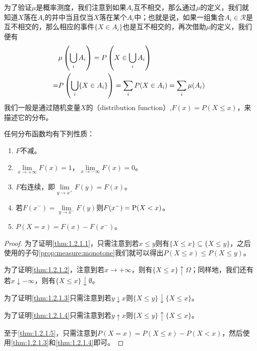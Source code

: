 \documentclass[main.tex]{subfiles}
\begin{document}
为了验证\(\mu\)是概率测度，我们注意到如果\(A_i\)互不相交，那么通过\(\mu\)的定义，我们就知道\(X\)落在\(A_i\)的并中当且仅当\(X\)落在某个\(A_i\)中；也就是说，如果一组集合\(A_i \in \mathcal{R}\)是互不相交的，那么相应的事件\(\{X \in A_i\}\)也是互不相交的，再次借助\(\mu\)的定义，我们便有
\[\begin{split}
	&\mu\del{\bigcup_{i}A_i} = P\del{X \in \bigcup_{i}A_i}\\ =&P\del{\bigcup_{i} \{X \in A_i\}} = \sum_{i} P(X \in A_i) = \sum_i \mu(A_i)
\end{split}\]
我们一般是通过随机变量\(X\)的（distribution function）,\(F(x) = P(X \leq x)\)，来描述它的分布。

\begin{theorem} \label{thm:1.2.1}
	任何分布函数均有下列性质：
	\begin{enumerate}
		\item \label{thm:1.2.1.1} \(F\)不减。
		\item\label{thm:1.2.1.2} \(\lim\limits_{x \rightarrow +\infty} F(x) = 1\)，\(\lim\limits_{x \rightarrow -\infty} F(x) = 0\)。
		\item\label{thm:1.2.1.3} \(F\)右连续，即\(\lim\limits_{y \rightarrow x^+} F(y) = F(x)\)。
		\item\label{thm:1.2.1.4} 若\(F(x^-) = \lim\limits_{y\rightarrow x^-}F(y)\)则\(F(x^-) = \operatorname{\mathrm{P}}(X < x)\)。
		\item\label{thm:1.2.1.5} \(P(X=x) = F(x) - F(x^-)\)。
	\end{enumerate}
\end{theorem}
\begin{proof}
	为了证明\ref{thm:1.2.1.1}，只需注意到若\(x \leq y\)则有\(\{X \leq x\} \subseteq \{X \leq y\}\)，之后使用的子句\ref{prop:measure:monotone}我们就可以得出\(P(X \leq x) \leq P(X \leq y)\)。

	为了证明\ref{thm:1.2.1.2}，注意到若\(x \rightarrow +\infty\)，则有\(\{X \leq x\} \uparrow \Omega\)；同样地，我们还有若\(x \downarrow -\infty\)，则有\(\{X \leq x\} \downarrow \emptyset\)。

	为了证明\ref{thm:1.2.1.3}只需注意到若\(y\downarrow x\)则\(\{X \leq y\} \downarrow \{X \leq x\}\)。

	为了证明\ref{thm:1.2.1.4}只需注意到若\(y\uparrow x\)则\(\{X \leq y\} \uparrow \{X \leq x\}\)。

	至于\ref{thm:1.2.1.5}，只需注意到\(P(X = x) = P(X \leq x) - P(X < x)\)，然后使用\ref{thm:1.2.1.3}和\ref{thm:1.2.1.4}即可。
\end{proof}
\end{document}
